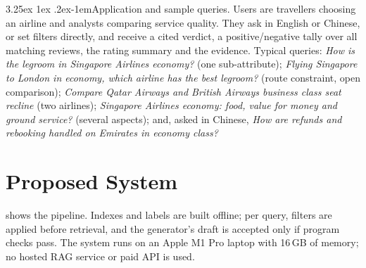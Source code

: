\documentclass[10pt,twocolumn,a4paper]{article}
\makeatletter
\renewcommand\paragraph{\@startsection{paragraph}{4}{\parindent}%
  {3.25ex \@plus 1ex \@minus .2ex}{-1em}{\normalfont\normalsize\bfseries}}
\makeatother
\begin{document}
\paragraph{Application and sample queries.} Users are travellers choosing an airline and analysts comparing service
quality. They ask in English or Chinese, or set filters directly, and receive a cited verdict, a positive/negative tally
over all matching reviews, the rating summary and the evidence. Typical queries: \emph{How is the legroom in Singapore
Airlines economy?} (one sub-attribute); \emph{Flying Singapore to London in economy, which airline has the best
legroom?} (route constraint, open comparison); \emph{Compare Qatar Airways and British Airways business class seat
recline} (two airlines); \emph{Singapore Airlines economy: food, value for money and ground service?} (several
aspects); and, asked in Chinese, \emph{How are refunds and rebooking handled on Emirates in economy class?}

\section{Proposed System}
\label{sec:method}

 shows the pipeline. Indexes and labels are built offline; per query, filters are applied before
retrieval, and the generator's draft is accepted only if program checks pass. The system runs on an Apple M1 Pro
laptop with 16\,GB of memory; no hosted RAG service or paid API is used.
\end{document}
